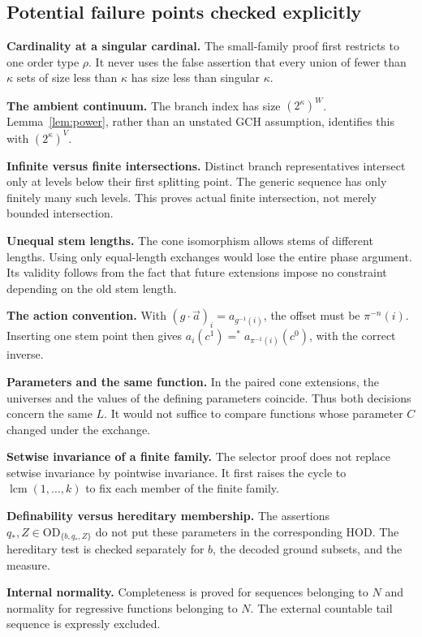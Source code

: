 \documentclass[11pt,letterpaper]{article}
\theoremstyle{definition}
\numberwithin{equation}{section}
\newcommand{\OD}{\mathrm{OD}}
\newcommand{\lcm}{\operatorname{lcm}}
\begin{document}
\subsection{Potential failure points checked explicitly}

\textbf{Cardinality at a singular cardinal.} The small-family proof first restricts to one order type $\rho$. It never uses the false assertion that every union of fewer than $\kappa$ sets of size less than $\kappa$ has size less than singular $\kappa$.

\textbf{The ambient continuum.} The branch index has size $(2^\kappa)^W$. Lemma~\ref{lem:power}, rather than an unstated GCH assumption, identifies this with $(2^\kappa)^V$.

\textbf{Infinite versus finite intersections.} Distinct branch representatives intersect only at levels below their first splitting point. The generic sequence has only finitely many such levels. This proves actual finite intersection, not merely bounded intersection.

\textbf{Unequal stem lengths.} The cone isomorphism allows stems of different lengths. Using only equal-length exchanges would lose the entire phase argument. Its validity follows from the fact that future extensions impose no constraint depending on the old stem length.

\textbf{The action convention.} With $(g\cdot\vec a)_i=a_{g^{-1}(i)}$, the offset must be $\pi^{-n}(i)$. Inserting one stem point then gives $a_i(c^1)=^*a_{\pi^{-1}(i)}(c^0)$, with the correct inverse.

\textbf{Parameters and the same function.} In the paired cone extensions, the universes and the values of the defining parameters coincide. Thus both decisions concern the same $L$. It would not suffice to compare functions whose parameter $C$ changed under the exchange.

\textbf{Setwise invariance of a finite family.} The selector proof does not replace setwise invariance by pointwise invariance. It first raises the cycle to $\lcm(1,\ldots,k)$ to fix each member of the finite family.

\textbf{Definability versus hereditary membership.} The assertions $q_*,Z\in\OD_{\{b,q_*,Z\}}$ do not put these parameters in the corresponding HOD. The hereditary test is checked separately for $b$, the decoded ground subsets, and the measure.

\textbf{Internal normality.} Completeness is proved for sequences belonging to $N$ and normality for regressive functions belonging to $N$. The external countable tail sequence is expressly excluded.
\end{document}
